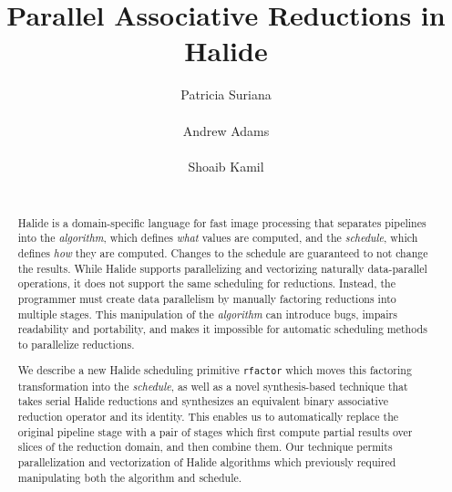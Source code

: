 \documentclass[10pt]{main}
\newcommand{\code}[1]{\texttt{#1}}
\begin{document}
\makeatletter
\def\@copyrightspace{\relax}
\makeatother


\title{Parallel Associative Reductions in Halide}

\author{
\alignauthor
Patricia Suriana\\
       \\
\alignauthor
Andrew Adams\\
       \\
\alignauthor Shoaib Kamil\\
       \\
}

\maketitle
\begin{abstract}

  Halide is a domain-specific language for fast image processing that separates pipelines into the \emph{algorithm}, which defines \emph{what} values are computed, and the \emph{schedule}, which defines \emph{how} they are computed. Changes to the schedule are guaranteed to not change the results. While Halide supports parallelizing and vectorizing naturally data-parallel operations, it does not support the same scheduling for reductions. Instead, the programmer must create data parallelism by manually factoring reductions into multiple stages. This manipulation of the \emph{algorithm} can introduce bugs, impairs readability and portability, and makes it impossible for automatic scheduling methods to parallelize reductions.

  We describe a new Halide scheduling primitive \code{rfactor} which moves this factoring transformation into the \emph{schedule}, as well as a novel synthesis-based technique that takes serial Halide reductions and synthesizes an equivalent binary associative reduction operator and its identity. This enables us to automatically replace the original pipeline stage with a pair of stages which first compute partial results over slices of the reduction domain, and then combine them. Our technique permits parallelization and vectorization of Halide algorithms which previously required manipulating both the algorithm and schedule.

\end{abstract}
\end{document}
